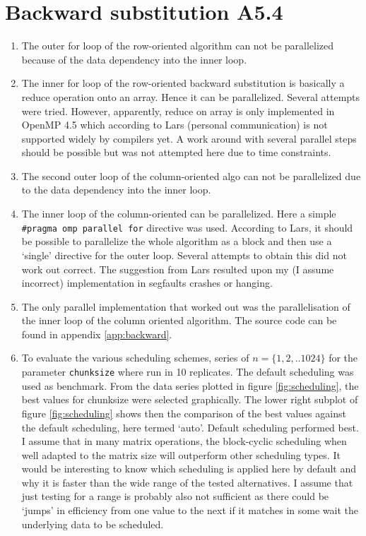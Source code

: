 \documentclass[a4paper,11pt,twoside]{article}
\begin{document}
\section{Backward substitution A5.4}
\begin{enumerate}[label={\alph*)}]
\item The outer for loop of the row-oriented algorithm can not be parallelized because of the data dependency into the inner loop. 
\item The inner for loop of the row-oriented backward substitution is basically a reduce operation onto an array. Hence it can be parallelized. Several attempts were tried. However, apparently, reduce on array is only implemented in OpenMP 4.5 which according to Lars (personal communication) is not supported widely by compilers yet. A work around with several parallel steps should be possible but was not attempted here due to time constraints. 
\item The second outer loop of the column-oriented algo can not be parallelized due to the data dependency into the inner loop. 
\item The inner loop of the column-oriented can be parallelized. Here a simple \verb+#pragma omp parallel for+ directive was used. According to Lars, it should be possible to parallelize the whole algorithm as a block and then use a `single' directive for the outer loop. Several attempts to obtain this did not work out correct. The suggestion from Lars resulted upon my (I assume incorrect) implementation in segfaults crashes or hanging. 
\item The only parallel implementation that worked out was the parallelisation of the inner loop of the column oriented algorithm. The source code can be found in appendix \ref{app:backward}.

\item To evaluate the various scheduling schemes, series of $n = \{1, 2, .. 1024\}$ for the parameter \verb+chunksize+ where run in 10 replicates. The default scheduling was used as benchmark. From the data series plotted in figure \ref{fig:scheduling}, the best values for chunksize were selected graphically. The lower right subplot of figure \ref{fig:scheduling} shows then the comparison of the best values against the default scheduling, here termed `auto'. Default scheduling performed best. I assume that in many matrix operations, the block-cyclic scheduling when well adapted to the matrix size will outperform other scheduling types. It would be interesting to know which scheduling is applied here by default and why it is faster than the wide range of the tested alternatives. I assume that just testing for a range is probably also not sufficient as there could be `jumps' in efficiency from one value to the next if it matches in some wait the underlying data to be scheduled.  
\end{enumerate}
\end{document}
